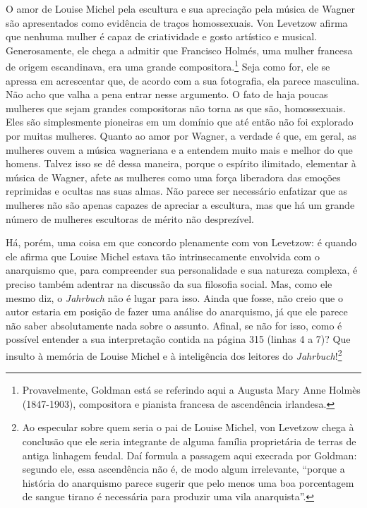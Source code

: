 O amor de Louise Michel pela escultura e sua apreciação pela música de
Wagner são apresentados como evidência de traços homossexuais. Von
Levetzow afirma que nenhuma mulher é capaz de criatividade e gosto
artístico e musical. Generosamente, ele chega a admitir que Francisco
Holmés, uma mulher francesa de origem escandinava, era uma grande
compositora.\footnote{Provavelmente, Goldman está se referindo aqui a
  Augusta Mary Anne Holmès (1847-1903), compositora e pianista francesa
  de ascendência irlandesa.} Seja como for, ele se apressa em
acrescentar que, de acordo com a sua fotografia, ela parece masculina.
Não acho que valha a pena entrar nesse argumento. O fato de haja poucas
mulheres que sejam grandes compositoras não torna as que são,
homossexuais. Eles são simplesmente pioneiras em um domínio que até
então não foi explorado por muitas mulheres. Quanto ao amor por Wagner,
a verdade é que, em geral, as mulheres ouvem a música wagneriana e a
entendem muito mais e melhor do que homens. Talvez isso se dê dessa
maneira, porque o espírito ilimitado, elementar à música de Wagner,
afete as mulheres como uma força liberadora das emoções reprimidas e
ocultas nas suas almas. Não parece ser necessário enfatizar que as
mulheres não são apenas capazes de apreciar a escultura, mas que há um
grande número de mulheres escultoras de mérito não desprezível.

Há, porém, uma coisa em que concordo plenamente com von Levetzow: é
quando ele afirma que Louise Michel estava tão intrinsecamente envolvida
com o anarquismo que, para compreender sua personalidade e sua natureza
complexa, é preciso também adentrar na discussão da sua filosofia
social. Mas, como ele mesmo diz, o \emph{Jahrbuch} não é lugar para
isso. Ainda que fosse, não creio que o autor estaria em posição de fazer
uma análise do anarquismo, já que ele parece não saber absolutamente
nada sobre o assunto. Afinal, se não for isso, como é possível entender
a sua interpretação contida na página 315 (linhas 4 a 7)? Que insulto à
memória de Louise Michel e à inteligência dos leitores do
\emph{Jahrbuch}!\footnote{Ao especular sobre quem seria o pai de Louise
  Michel, von Levetzow chega à conclusão que ele seria integrante de
  alguma família proprietária de terras de antiga linhagem feudal. Daí
  formula a passagem aqui execrada por Goldman: segundo ele, essa
  ascendência não é, de modo algum irrelevante, ``porque a história do
  anarquismo parece sugerir que pelo menos uma boa porcentagem de sangue
  tirano é necessária para produzir uma vila anarquista''.}

